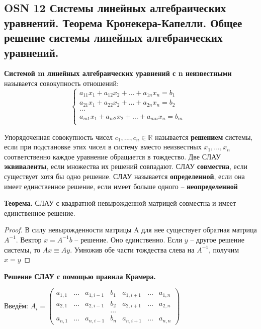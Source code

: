 \subsection*{OSN 12 Системы линейных алгебраических уравнений. Теорема Кронекера-Капелли. Общее решение системы линейных алгебраических уравнений.}

\textbf{Системой m линейных алгебраических уравнений с n неизвестными} называется совокупность отношений:
    $$\begin{cases}
        a_{11}x_1 + a_{12}x_2+\dots+a_{1n}x_n = b_1&\\
        a_{21}x_1 + a_{22}x_2+\dots+a_{2n}x_n = b_2&\\
        \dots&\\
        a_{m1}x_1 + a_{m2}x_2+\dots+a_{mn}x_n = b_m&\\
    \end{cases}$$
    
Упорядоченная совокупность чисел $c_1, ..., c_n \in\mathbb{R}$ называется \textbf{решением} системы, если при подстановке этих чисел в систему вместо неизвестных $x_1, ..., x_n$ соответственно каждое уравнение обращается в тождество.
Две СЛАУ \textbf{эквиваленты}, если множества их решений совпадают.
СЛАУ \textbf{совместна}, если существует хотя бы одно решение.
СЛАУ называется \textbf{определенной}, если она имеет единственное решение, если имеет больше одного -- \textbf{неопределенной}


\textbf{Теорема.} СЛАУ с квадратной невырожденной матрицей совместна и имеет единственное решение.

\begin{proof}
В силу невырожденности матрицы A для нее существует обратная матрица $A^{-1}$.
Вектор $x = A^{-1}b$ -- решение. Оно единственно. Если $y$ -- другое решение системы, то $Ax \equiv Ay$. Умножив обе части тождества слева на $A^{-1}$, получим $x = y$
\end{proof}

\textbf{Решение СЛАУ с помощью правила Крамера.}

Введём:
$A_i = \begin{pmatrix} a_{1,1} & \dots & a_{1,i-1} & b_1 & a_{1,i+1} & \dots & a_{1,n} \\
           a_{2,1} & \dots & a_{2,i-1} & b_2 & a_{2,i+1} & \dots & a_{2,n} \\
            & & & \dots & & & \\
           a_{n,1} & \dots & a_{n,i-1} & b_n & a_{n,i+1} & \dots & a_{n,n}
\end{pmatrix}$

